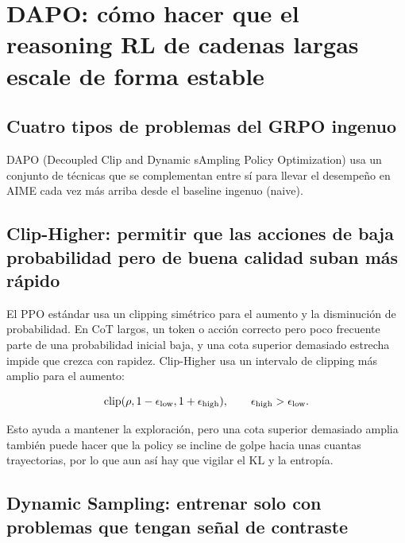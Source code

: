 \section{DAPO: cómo hacer que el reasoning RL de cadenas largas escale de forma estable}

\subsection{Cuatro tipos de problemas del GRPO ingenuo}


DAPO (Decoupled Clip and Dynamic sAmpling Policy Optimization) usa un conjunto de técnicas que se complementan entre sí para llevar el desempeño en AIME cada vez más arriba desde el baseline ingenuo (naive).

\subsection{Clip-Higher: permitir que las acciones de baja probabilidad pero de buena calidad suban más rápido}

El PPO estándar usa un clipping simétrico para el aumento y la disminución de probabilidad. En CoT largos, un token o acción correcto pero poco frecuente parte de una probabilidad inicial baja, y una cota superior demasiado estrecha impide que crezca con rapidez. Clip-Higher usa un intervalo de clipping más amplio para el aumento:

$$
\operatorname{clip}(\rho,1-\epsilon_{\rm low},1+\epsilon_{\rm high}),
\qquad \epsilon_{\rm high}>\epsilon_{\rm low}.
$$


Esto ayuda a mantener la exploración, pero una cota superior demasiado amplia también puede hacer que la policy se incline de golpe hacia unas cuantas trayectorias, por lo que aun así hay que vigilar el KL y la entropía.

\subsection{Dynamic Sampling: entrenar solo con problemas que tengan señal de contraste}


